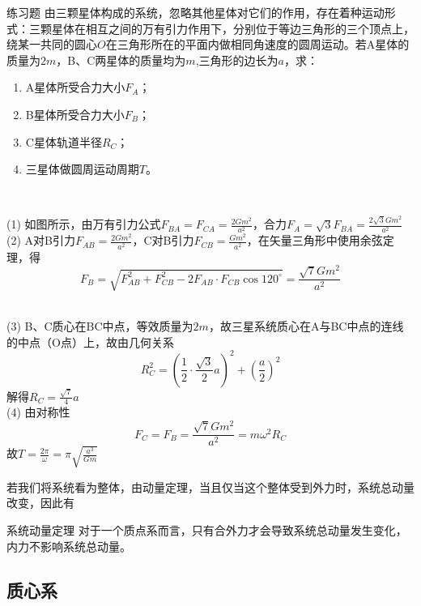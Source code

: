 \begin{ep}{练习题}{}
由三颗星体构成的系统，忽略其他星体对它们的作用，存在着种运动形式：三颗星体在相互之间的万有引力作用下，分别位于等边三角形的三个顶点上，绕某一共同的圆心$O$在三角形所在的平面内做相同角速度的圆周运动。若A星体的质量为$2m$，B、C两星体的质量均为$m$,三角形的边长为$a$，求：

\begin{enumerate}[label=(\arabic*)]
  \item A星体所受合力大小$F_A$；
  \item B星体所受合力大小$F_B$；
  \item C星体轨道半径$R_C$；
  \item 三星体做圆周运动周期$T$。
\end{enumerate}
~\\

\begin{minipage}[b]{0.65\linewidth}
(1) 如图所示，由万有引力公式$F_{BA}=F_{CA}=\frac{2 G m^2}{a^2}$，合力$F_A = \sqrt{3} F_{BA} = \frac{2\sqrt{3} G m^2}{a^2}$
~\\

(2) A对B引力$F_{AB}=\frac{2 G m^2}{a^2}$，C对B引力$F_{CB}=\frac{G m^2}{a^2}$，在矢量三角形中使用余弦定理，得
$$F_B = \sqrt{F_{AB}^2+F_{CB}^2-2F_{AB} \cdot F_{CB} \cos{120^{\circ}}}=\frac{\sqrt{7}G m^2}{a^2}$$
\end{minipage}
\hfill
\begin{minipage}[b]{0.35\linewidth}

\end{minipage}
~\\

(3) B、C质心在BC中点，等效质量为$2m$，故三星系统质心在A与BC中点的连线的中点（O点）上，故由几何关系
$$R_C^2 = (\frac{1}{2} \cdot \frac{\sqrt{3}}{2} a)^2+(\frac{a}{2})^2$$
解得$R_C = \frac{\sqrt{7}}{4} a$
~\\

(4) 由对称性
$$F_C = F_B = \frac{\sqrt{7}G m^2}{a^2} = m \omega ^2 R_C$$
故$T=\frac{2 \pi}{\omega}=\pi \sqrt{\frac{a^3}{G m}}$

\end{ep}

若我们将系统看为整体，由动量定理，当且仅当这个整体受到外力时，系统总动量改变，因此有

\begin{theo}{系统动量定理}{}
对于一个质点系而言，只有合外力才会导致系统总动量发生变化，内力不影响系统总动量。
\end{theo}

\subsection{质心系}

